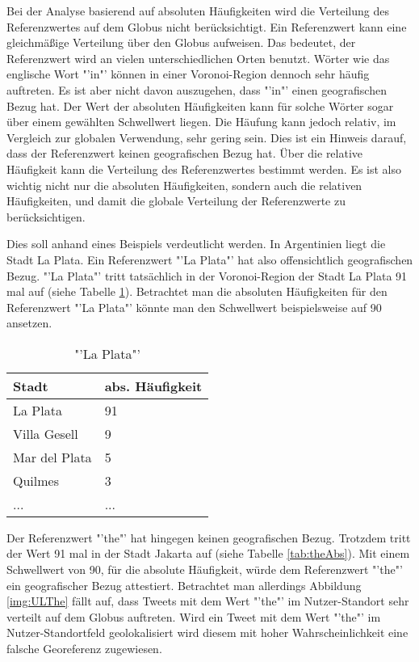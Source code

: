 			Bei der Analyse basierend auf absoluten Häufigkeiten wird die Verteilung des Referenzwertes auf dem Globus nicht berücksichtigt.
			Ein Referenzwert kann eine gleichmäßige Verteilung über den Globus aufweisen.
			Das bedeutet, der Referenzwert wird an vielen unterschiedlichen Orten benutzt. 
			Wörter wie das englische Wort "'in"' können in einer Voronoi-Region dennoch sehr häufig auftreten. 
			Es ist aber nicht davon auszugehen, dass "'in"' einen geografischen Bezug hat.  
			Der Wert der absoluten Häufigkeiten kann für solche Wörter sogar über einem gewählten Schwellwert liegen.
			Die Häufung kann jedoch relativ, im Vergleich zur globalen Verwendung, sehr gering sein.
			Dies ist ein Hinweis darauf, dass der Referenzwert keinen geografischen Bezug hat.
			Über die relative Häufigkeit kann die Verteilung des Referenzwertes bestimmt werden. 
			Es ist also wichtig nicht nur die absoluten Häufigkeiten, sondern auch die relativen Häufigkeiten, und damit die globale Verteilung der Referenzwerte zu berücksichtigen.

			Dies soll anhand eines Beispiels verdeutlicht werden.
			In Argentinien liegt die Stadt La Plata. 
			Ein Referenzwert "'La Plata"' hat also offensichtlich geografischen Bezug.
			"'La Plata"' tritt tatsächlich in der Voronoi-Region der Stadt La Plata 91 mal auf (siehe Tabelle \ref{tab:laPlataAbs}).			 
			Betrachtet man die absoluten Häufigkeiten für den Referenzwert "'La Plata"' könnte man den Schwellwert beispielsweise auf 90 ansetzen.

			\begin{table}[h]
				\centering
				\caption{"'La Plata"'}
				\label{tab:laPlataAbs}
				\begin{tabular}{|l|l|}
				\hline
				Stadt            & abs. Häufigkeit  \\ \hline \hline
				La Plata         & 91              \\ \hline
				Villa Gesell     & 9               \\ \hline
				Mar del Plata    & 5               \\ \hline
				Quilmes          & 3               \\ \hline
				... & ... \\ \hline
				\end{tabular}
			\end{table}

			Der Referenzwert "'the"' hat hingegen keinen geografischen Bezug.
			Trotzdem tritt der Wert 91 mal in der Stadt Jakarta auf (siehe Tabelle \ref{tab:theAbs}). 
			Mit einem Schwellwert von 90, für die absolute Häufigkeit, würde dem Referenzwert "'the"' ein geografischer Bezug attestiert.
			Betrachtet man allerdings Abbildung \ref{img:ULThe} fällt auf, dass Tweets mit dem Wert "'the"' im Nutzer-Standort sehr verteilt auf dem Globus auftreten.
			Wird ein Tweet mit dem Wert "'the"' im Nutzer-Standortfeld geolokalisiert wird diesem mit hoher Wahrscheinlichkeit eine falsche Georeferenz zugewiesen.

